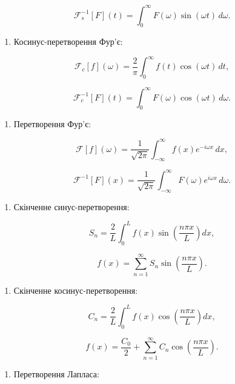 \documentclass[
  ukrainian,
]{article}
\providecommand{\tightlist}{%
  \setlength{\itemsep}{0pt}\setlength{\parskip}{0pt}}
\begin{document}
\[
\mathcal{F}_s^{-1}[F](t) = \int_0^\infty F(\omega)\sin(\omega t)\,d\omega.
\]

\begin{enumerate}
\def\labelenumi{\arabic{enumi}.}
\setcounter{enumi}{1}
\tightlist
\item
  Косинус-перетворення Фур'є:
\end{enumerate}

\[
\mathcal{F}_c[f](\omega) = \frac{2}{\pi}\int_0^\infty f(t)\cos(\omega t)\,dt,
\]

\[
\mathcal{F}_c^{-1}[F](t) = \int_0^\infty F(\omega)\cos(\omega t)\,d\omega.
\]

\begin{enumerate}
\def\labelenumi{\arabic{enumi}.}
\setcounter{enumi}{2}
\tightlist
\item
  Перетворення Фур'є:
\end{enumerate}

\[
\mathcal{F}[f](\omega) = \frac{1}{\sqrt{2\pi}}\int_{-\infty}^{\infty} f(x)e^{-i\omega x}\,dx,
\]

\[
\mathcal{F}^{-1}[F](x) = \frac{1}{\sqrt{2\pi}}\int_{-\infty}^{\infty} F(\omega)e^{i\omega x}\,d\omega.
\]

\begin{enumerate}
\def\labelenumi{\arabic{enumi}.}
\setcounter{enumi}{3}
\tightlist
\item
  Скінченне синус-перетворення:
\end{enumerate}

\[
S_n = \frac{2}{L}\int_0^L f(x)\sin\!\left(\frac{n\pi x}{L}\right) dx,
\]

\[
f(x) = \sum_{n=1}^{\infty} S_n \sin\!\left(\frac{n\pi x}{L}\right).
\]

\begin{enumerate}
\def\labelenumi{\arabic{enumi}.}
\setcounter{enumi}{4}
\tightlist
\item
  Скінченне косинус-перетворення:
\end{enumerate}

\[
C_n = \frac{2}{L}\int_0^L f(x)\cos\!\left(\frac{n\pi x}{L}\right) dx,
\]

\[
f(x) = \frac{C_0}{2} + \sum_{n=1}^{\infty} C_n \cos\!\left(\frac{n\pi x}{L}\right).
\]

\begin{enumerate}
\def\labelenumi{\arabic{enumi}.}
\setcounter{enumi}{5}
\tightlist
\item
  Перетворення Лапласа:
\end{enumerate}
\end{document}
